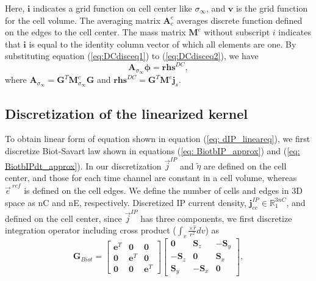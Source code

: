 \documentclass[a4paper, 11pt]{article}
\newcommand{\siginf}{\sigma_\infty}
\newcommand{\dgrad}{{\mathbf G}}
\newcommand{\Ace}{{\mathbf A_c^e}}
\newcommand{\M}{{\mathbf M}}
\newcommand{\MeSigInf}{{\M^e_{\sigma_\infty}}}
\newcommand{\Me}{{\M^e}}
\renewcommand {\j}  { {\vec j} }
\newcommand {\e}  { {\vec e} }
\renewcommand {\dj}  { {\mathbf{j} } }
\newcommand{\vol}{\mathbf{v}}
\newcommand{\A}{\mathbf{A}}
\newcommand{\peta}{\tilde{\eta}}
\newcommand{\eref}{\e^{\ ref}}
\begin{document}
Here, $\mathbf{i}$ indicates a grid function on cell center like $\siginf$, and $\vol$ is the grid function for the cell volume. The averaging matrix $\Ace$ averages discrete function defined on the edges to the cell center. The mass matrix $\Me$ without subscript $i$ indicates that $\mathbf{i}$ is equal to the identity column vector of which all elements are one. By substituting equation (\ref{eq:DCdisceq1}) to (\ref{eq:DCdisceq2}), we have
\begin{equation}
  \A_{\siginf}\boldsymbol{\phi} = \mathbf{rhs}^{DC},
  \label{eq:DCdiscLin}
\end{equation}
where $\A_{\siginf} = \dgrad^T \MeSigInf\dgrad$ and $\mathbf{rhs}^{DC} = \dgrad^T \Me\dj_s$. 

\subsection{Discretization of the linearized kernel}
\label{section:linearkernel_discrete}
To obtain linear form of equation shown in equation (\ref{eq: dIP_lineareq}),
we first discretize Biot-Savart law shown in equations (\ref{eq: BiotbIP_approx}) and (\ref{eq: BiotbIPdt_approx}). In our discretization $\j^{IP}$ and  $\peta$ are defined on the cell center, and those for each time channel are constant in a cell volume, whereas $\eref$ is defined on the cell edges. 
We define the number of cells and edges in 3D space as nC and nE, respectively. Discretized IP current density, $\dj^{IP}_{cc} \in \mathbb{R}^{3nC}_{1}$, and defined on the cell center, since $\j^{IP}$ has three components, we first discretize integration operator including cross product ($\int_{v}\frac{ \times \hat{r}}{r^2}dv$) as
\begin{equation}
  \mathbf{G}_{Biot} =
  \begin{bmatrix}
       \mathbf{e}^T &  \mathbf{0}   & \mathbf{0}  \\
       \mathbf{0}   &  \mathbf{e}^T & \mathbf{0}  \\
       \mathbf{0}   &  \mathbf{0}   & \mathbf{e}^T
    \end{bmatrix}
  \begin{bmatrix}
       \mathbf{0}     &   \mathbf{S}_z   & -\mathbf{S}_y  \\
      -\mathbf{S}_z   &   \mathbf{0}     &  \mathbf{S}_x  \\
       \mathbf{S}_y   &  -\mathbf{S}_x   &  \mathbf{0}
    \end{bmatrix},
 \end{equation}
\end{document}
